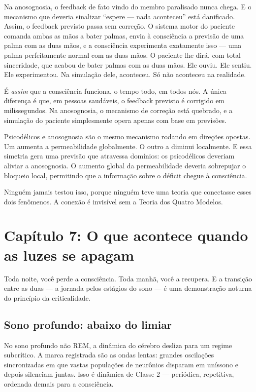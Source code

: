 \documentclass[11pt, twoside, openright]{book}
\begin{document}
Na anosognosia, o feedback de fato vindo do membro paralisado nunca chega. E o mecanismo que deveria sinalizar ``espere --- nada aconteceu'' está danificado. Assim, o feedback previsto passa sem correção. O sistema motor do paciente comanda ambas as mãos a bater palmas, envia à consciência a previsão de uma palma com as duas mãos, e a consciência experimenta exatamente isso --- uma palma perfeitamente normal com as duas mãos. O paciente lhe dirá, com total sinceridade, que acabou de bater palmas com as duas mãos. Ele ouviu. Ele sentiu. Ele experimentou. Na simulação dele, aconteceu. Só não aconteceu na realidade.

É \textit{assim} que a consciência funciona, o tempo todo, em todos nós. A única diferença é que, em pessoas saudáveis, o feedback previsto é corrigido em milissegundos. Na anosognosia, o mecanismo de correção está quebrado, e a simulação do paciente simplesmente opera apenas com base em previsões.

Psicodélicos e anosognosia são o mesmo mecanismo rodando em direções opostas. Um aumenta a permeabilidade globalmente. O outro a diminui localmente. E essa simetria gera uma previsão que atravessa domínios: os psicodélicos deveriam aliviar a anosognosia. O aumento global da permeabilidade deveria sobrepujar o bloqueio local, permitindo que a informação sobre o déficit chegue à consciência.

Ninguém jamais testou isso, porque ninguém teve uma teoria que conectasse esses dois fenômenos. A conexão é invisível sem a Teoria dos Quatro Modelos.


\chapter*{Capítulo 7: O que acontece quando as luzes se apagam}

Toda noite, você perde a consciência. Toda manhã, você a recupera. E a transição entre as duas --- a jornada pelos estágios do sono --- é uma demonstração noturna do princípio da criticalidade.

\section*{Sono profundo: abaixo do limiar}

No sono profundo não REM, a dinâmica do cérebro desliza para um regime subcrítico. A marca registrada são as ondas lentas: grandes oscilações sincronizadas em que vastas populações de neurônios disparam em uníssono e depois silenciam juntas. Isso é dinâmica de Classe 2 --- periódica, repetitiva, ordenada demais para a consciência.
\end{document}
